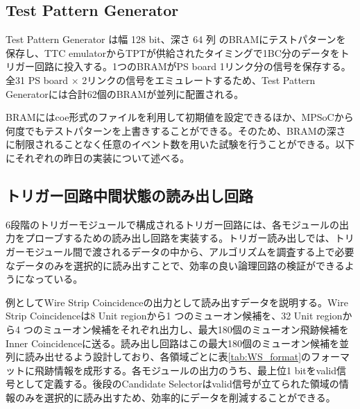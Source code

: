\subsection*{Test Pattern Generator}
Test Pattern Generator は幅 128 bit、深さ 64 列 のBRAMにテストパターンを保存し、TTC emulatorからTPTが供給されたタイミングで1BC分のデータをトリガー回路に投入する。1つのBRAMがPS board 1リンク分の信号を保存する。全31 PS board $\times$ 2リンクの信号をエミュレートするため、Test Pattern Generatorには合計62個のBRAMが並列に配置される。

BRAMにはcoe形式のファイルを利用して初期値を設定できるほか、MPSoCから何度でもテストパターンを上書きすることができる。そのため、BRAMの深さに制限されることなく任意のイベント数を用いた試験を行うことができる。以下にそれぞれの昨日の実装について述べる。


\subsection*{トリガー回路中間状態の読み出し回路}
6段階のトリガーモジュールで構成されるトリガー回路には、各モジュールの出力をプローブするための読み出し回路を実装する。トリガー読み出しでは、トリガーモジュール間で渡されるデータの中から、アルゴリズムを調査する上で必要なデータのみを選択的に読み出すことで、効率の良い論理回路の検証ができるようになっている。

例としてWire Strip Coincidenceの出力として読み出すデータを説明する。Wire Strip Coincidenceは8 Unit regionから1 つのミューオン候補を、32 Unit regionから4 つのミューオン候補をそれぞれ出力し、最大180個のミューオン飛跡候補をInner Coincidenceに送る。読み出し回路はこの最大180個のミューオン候補を並列に読み出せるよう設計しており、各領域ごとに表\ref{tab:WS_format}のフォーマットに飛跡情報を成形する。各モジュールの出力のうち、最上位1 bitをvalid信号として定義する。後段のCandidate Selectorはvalid信号が立てられた領域の情報のみを選択的に読み出すため、効率的にデータを削減することができる。


